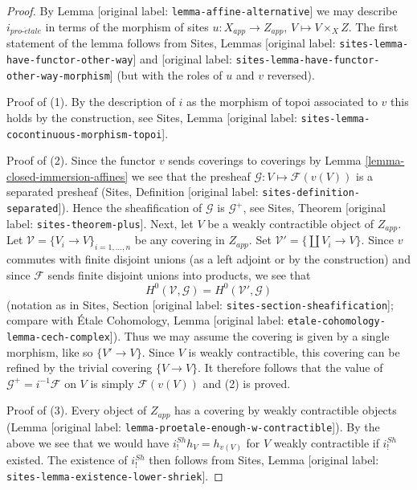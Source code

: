 \documentclass[10pt,a4paper]{article}
\theoremstyle{plain}
\theoremstyle{definition}
\theoremstyle{remark}
\numberwithin{equation}{subsection}
\def\proetale{{pro\text{-}\acute{e}tale}}
\begin{document}
\begin{proof}
By Lemma [original label: \nolinkurl{lemma-affine-alternative}] we may describe $i_\proetale$ in terms
of the morphism of sites $u : X_{app} \to Z_{app}$, $V \mapsto V \times_X Z$.
The first statement of the lemma follows from
Sites, Lemmas [original label: \nolinkurl{sites-lemma-have-functor-other-way}] and
[original label: \nolinkurl{sites-lemma-have-functor-other-way-morphism}]
(but with the roles of $u$ and $v$ reversed).

\medskip\noindent
Proof of (1). By the description of $i$ as the morphism of topoi associated
to $v$ this holds by the construction, see
Sites, Lemma [original label: \nolinkurl{sites-lemma-cocontinuous-morphism-topoi}].

\medskip\noindent
Proof of (2). Since the functor $v$ sends coverings to coverings by
Lemma \ref{lemma-closed-immersion-affines} we see that the presheaf
$\mathcal{G} : V \mapsto \mathcal{F}(v(V))$ is a separated presheaf
(Sites, Definition [original label: \nolinkurl{sites-definition-separated}]). Hence
the sheafification of $\mathcal{G}$ is $\mathcal{G}^+$, see
Sites, Theorem [original label: \nolinkurl{sites-theorem-plus}]. Next, let $V$ be a weakly
contractible object of $Z_{app}$. Let
$\mathcal{V} = \{V_i \to V\}_{i = 1, \ldots, n}$
be any covering in $Z_{app}$. Set $\mathcal{V}' = \{\coprod V_i \to V\}$.
Since $v$ commutes with finite disjoint unions (as a left adjoint or by
the construction) and since $\mathcal{F}$ sends finite disjoint
unions into products, we see that
$$
H^0(\mathcal{V}, \mathcal{G}) = H^0(\mathcal{V}', \mathcal{G})
$$
(notation as in Sites, Section [original label: \nolinkurl{sites-section-sheafification}];
compare with
\'Etale Cohomology, Lemma [original label: \nolinkurl{etale-cohomology-lemma-cech-complex}]).
Thus we may assume the covering is given by a single morphism, like
so $\{V' \to V\}$. Since $V$ is weakly contractible, this covering
can be refined by the trivial covering $\{V \to V\}$.
It therefore follows that the value of $\mathcal{G}^+ = i^{-1}\mathcal{F}$
on $V$ is simply $\mathcal{F}(v(V))$ and (2) is proved.

\medskip\noindent
Proof of (3). Every object of $Z_{app}$ has a covering by weakly
contractible objects (Lemma [original label: \nolinkurl{lemma-proetale-enough-w-contractible}]).
By the above we see that we would have $i^{Sh}_!h_V = h_{v(V)}$ for $V$
weakly contractible if $i^{Sh}_!$ existed. The existence of
$i^{Sh}_!$ then follows from
Sites, Lemma [original label: \nolinkurl{sites-lemma-existence-lower-shriek}].


\end{proof}
\end{document}
